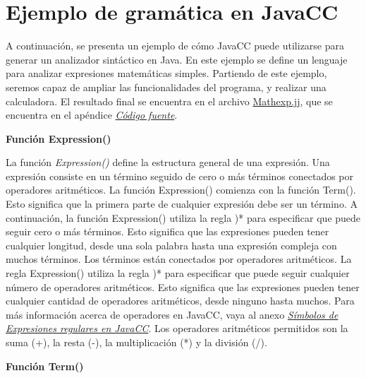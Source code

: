 \section{Ejemplo de gramática en JavaCC}
\noindent A continuación, se presenta un ejemplo de cómo JavaCC puede utilizarse para generar un analizador sintáctico en Java. En este ejemplo se define un lenguaje para analizar expresiones matemáticas simples. Partiendo de este ejemplo, seremos capaz de ampliar las funcionalidades del programa, y realizar una calculadora. El resultado final se encuentra en el archivo \hyperref[sec:mathexp]{Mathexp.jj}, que se encuentra en el apéndice \hyperref[sec:codigofuente]{\textit{Código fuente}}.

\phantom{text}

\noindent \textbf{Función Expression()}

\phantom{text}

\lstset{inputencoding=utf8/latin1}


\noindent La función \textit{Expression()} define la estructura general de una expresión. Una expresión consiste en un término seguido de cero o más términos conectados por operadores aritméticos. La función Expression() comienza con la función Term(). Esto significa que la primera parte de cualquier expresión debe ser un término. A continuación, la función Expression() utiliza la regla )* para especificar que puede seguir cero o más términos. Esto significa que las expresiones pueden tener cualquier longitud, desde una sola palabra hasta una expresión compleja con muchos términos.
Los términos están conectados por operadores aritméticos. La regla Expression() utiliza la regla )* para especificar que puede seguir cualquier número de operadores aritméticos. Esto significa que las expresiones pueden tener cualquier cantidad de operadores aritméticos, desde ninguno hasta muchos. Para más información acerca de operadores en JavaCC, vaya al anexo \hyperref[sec:simbolosdeexpresionesregulares]{\textit{Símbolos de Expresiones regulares en JavaCC}}.
Los operadores aritméticos permitidos son la suma (+), la resta (-), la multiplicación (*) y la división (/).

\phantom{text}

\noindent \textbf{Función Term()}

\phantom{text}

\lstset{inputencoding=utf8/latin1}


